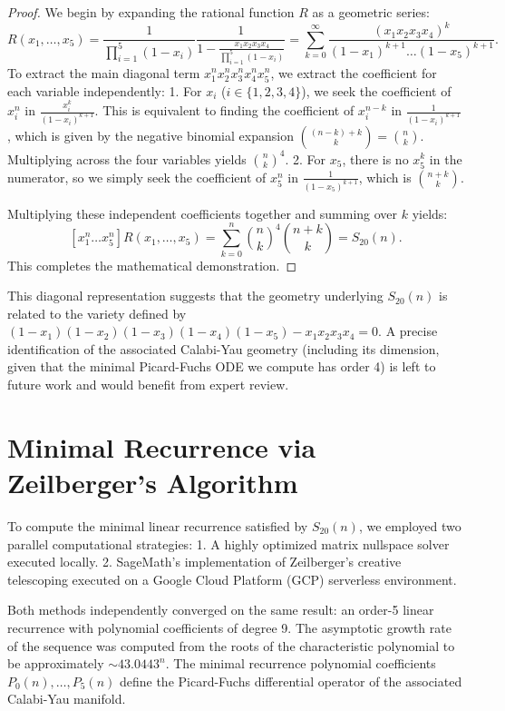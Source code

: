 \documentclass[11pt, a4paper]{article}
\begin{document}
\begin{proof}
We begin by expanding the rational function $R$ as a geometric series:
\[
R(x_1, \dots, x_5) = \frac{1}{\prod_{i=1}^5 (1-x_i)} \frac{1}{1 - \frac{x_1 x_2 x_3 x_4}{\prod_{i=1}^5 (1-x_i)}} = \sum_{k=0}^\infty \frac{(x_1 x_2 x_3 x_4)^k}{(1-x_1)^{k+1} \dots (1-x_5)^{k+1}}.
\]
To extract the main diagonal term $x_1^n x_2^n x_3^n x_4^n x_5^n$, we extract the coefficient for each variable independently:
1. For $x_i$ ($i \in \{1,2,3,4\}$), we seek the coefficient of $x_i^n$ in $\frac{x_i^k}{(1-x_i)^{k+1}}$. This is equivalent to finding the coefficient of $x_i^{n-k}$ in $\frac{1}{(1-x_i)^{k+1}}$, which is given by the negative binomial expansion $\binom{(n-k)+k}{k} = \binom{n}{k}$. Multiplying across the four variables yields $\binom{n}{k}^4$.
2. For $x_5$, there is no $x_5^k$ in the numerator, so we simply seek the coefficient of $x_5^n$ in $\frac{1}{(1-x_5)^{k+1}}$, which is $\binom{n+k}{k}$.

Multiplying these independent coefficients together and summing over $k$ yields:
\[
[x_1^n \dots x_5^n] R(x_1, \dots, x_5) = \sum_{k=0}^n \binom{n}{k}^4 \binom{n+k}{k} = S_{20}(n).
\]
This completes the mathematical demonstration.
\end{proof}
This diagonal representation suggests that the geometry underlying $S_{20}(n)$ is related to the variety defined by $(1-x_1)(1-x_2)(1-x_3)(1-x_4)(1-x_5) - x_1 x_2 x_3 x_4 = 0$. A precise identification of the associated Calabi-Yau geometry (including its dimension, given that the minimal Picard-Fuchs ODE we compute has order 4) is left to future work and would benefit from expert review.

\section{Minimal Recurrence via Zeilberger's Algorithm}
To compute the minimal linear recurrence satisfied by $S_{20}(n)$, we employed two parallel computational strategies:
1. A highly optimized matrix nullspace solver executed locally.
2. SageMath's implementation of Zeilberger's creative telescoping executed on a Google Cloud Platform (GCP) serverless environment.

Both methods independently converged on the same result: an order-5 linear recurrence with polynomial coefficients of degree 9. The asymptotic growth rate of the sequence was computed from the roots of the characteristic polynomial to be approximately $\sim 43.0443^n$. The minimal recurrence polynomial coefficients $P_0(n), \dots, P_5(n)$ define the Picard-Fuchs differential operator of the associated Calabi-Yau manifold.
\end{document}

